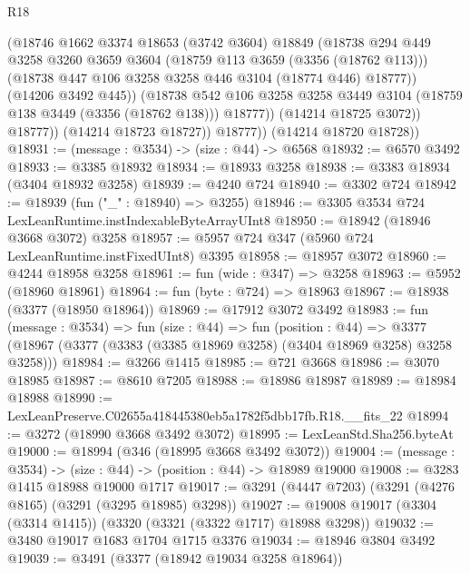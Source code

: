 \begin{lexlean}{R18}
\begin{coremodule}
                    (@18746
                      @1662
                      @3374
                      @18653
                      (@3742 @3604)
                      @18849
                      (@18738
                        @294
                        @449
                        @3258
                        @3260
                        @3659
                        @3604
                        (@18759 @113 @3659 (@3356 (@18762 @113)))
                        (@18738 @447 @106 @3258 @3258 @446 @3104 (@18774 @446) @18777))
                      (@14206 @3492 @445))
                    (@18738
                      @542
                      @106
                      @3258
                      @3258
                      @3449
                      @3104
                      (@18759 @138 @3449 (@3356 (@18762 @138)))
                      @18777))
                  (@14214 @18725 @3072))
                @18777))
            (@14214 @18723 @18727))
          @18777))
      (@14214 @18720 @18728))
@18931 := (message : @3534) -> (size : @44) -> @6568
@18932 := @6570 @3492
@18933 := @3385 @18932
@18934 := @18933 @3258
@18938 := @3383 @18934 (@3404 @18932 @3258)
@18939 := @4240 @724
@18940 := @3302 @724
@18942 := @18939 (fun ("_" : @18940) => @3255)
@18946 := @3305 @3534 @724 LexLeanRuntime.instIndexableByteArrayUInt8
@18950 := @18942 (@18946 @3668 @3072) @3258
@18957 := @5957 @724 @347 (@5960 @724 LexLeanRuntime.instFixedUInt8) @3395
@18958 := @18957 @3072
@18960 := @4244 @18958 @3258
@18961 := fun (wide : @347) => @3258
@18963 := @5952 (@18960 @18961)
@18964 := fun (byte : @724) => @18963
@18967 := @18938 (@3377 (@18950 @18964))
@18969 := @17912 @3072 @3492
@18983 := fun (message : @3534) =>
  fun (size : @44) =>
  fun (position : @44) =>
  @3377 (@18967 (@3377 (@3383 (@3385 @18969 @3258) (@3404 @18969 @3258) @3258 @3258)))
@18984 := @3266 @1415
@18985 := @721 @3668
@18986 := @3070 @18985
@18987 := @8610 @7205
@18988 := @18986 @18987
@18989 := @18984 @18988
@18990 := LexLeanPreserve.C02655a418445380eb5a1782f5dbb17fb.R18.__fits_22
@18994 := @3272 (@18990 @3668 @3492 @3072)
@18995 := LexLeanStd.Sha256.byteAt
@19000 := @18994 (@346 (@18995 @3668 @3492 @3072))
@19004 := (message : @3534) -> (size : @44) -> (position : @44) -> @18989 @19000
@19008 := @3283 @1415 @18988 @19000 @1717
@19017 := @3291 (@4447 @7203) (@3291 (@4276 @8165) (@3291 (@3295 @18985) @3298))
@19027 := @19008 @19017 (@3304 (@3314 @1415)) (@3320 (@3321 (@3322 @1717) @18988 @3298))
@19032 := @3480 @19017 @1683 @1704 @1715 @3376
@19034 := @18946 @3804 @3492
@19039 := @3491 (@3377 (@18942 @19034 @3258 @18964))

\end{coremodule}
\end{lexlean}
